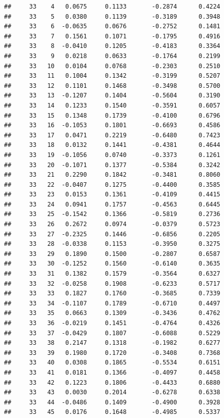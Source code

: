 \documentclass[
]{article}
\begin{document}
\begin{verbatim}
##     33    4   0.0675     0.1133       -0.2874      0.4224  
##     33    5   0.0380     0.1139       -0.3189      0.3948  
##     33    6  -0.0635     0.0676       -0.2752      0.1481  
##     33    7   0.1561     0.1071       -0.1795      0.4916  
##     33    8  -0.0410     0.1205       -0.4183      0.3364  
##     33    9   0.0218     0.0633       -0.1764      0.2199  
##     33   10   0.0104     0.0768       -0.2303      0.2510  
##     33   11   0.1004     0.1342       -0.3199      0.5207  
##     33   12   0.1101     0.1468       -0.3498      0.5700  
##     33   13  -0.1207     0.1404       -0.5604      0.3190  
##     33   14   0.1233     0.1540       -0.3591      0.6057  
##     33   15   0.1348     0.1739       -0.4100      0.6796  
##     33   16  -0.1053     0.1801       -0.6693      0.4586  
##     33   17   0.0471     0.2219       -0.6480      0.7423  
##     33   18   0.0132     0.1441       -0.4381      0.4644  
##     33   19  -0.1056     0.0740       -0.3373      0.1261  
##     33   20  -0.1071     0.1377       -0.5384      0.3242  
##     33   21   0.2290     0.1842       -0.3481      0.8060  
##     33   22  -0.0407     0.1275       -0.4400      0.3585  
##     33   23   0.0153     0.1361       -0.4109      0.4415  
##     33   24   0.0941     0.1757       -0.4563      0.6445  
##     33   25  -0.1542     0.1366       -0.5819      0.2736  
##     33   26   0.2672     0.0974       -0.0379      0.5723  
##     33   27  -0.2325     0.1446       -0.6856      0.2205  
##     33   28  -0.0338     0.1153       -0.3950      0.3275  
##     33   29   0.1890     0.1500       -0.2807      0.6587  
##     33   30  -0.1252     0.1560       -0.6140      0.3635  
##     33   31   0.1382     0.1579       -0.3564      0.6327  
##     33   32  -0.0258     0.1908       -0.6233      0.5717  
##     33   33   0.1827     0.1760       -0.3685      0.7339  
##     33   34  -0.1107     0.1789       -0.6710      0.4497  
##     33   35   0.0663     0.1309       -0.3436      0.4762  
##     33   36  -0.0219     0.1451       -0.4764      0.4326  
##     33   37  -0.0429     0.1807       -0.6088      0.5229  
##     33   38   0.2147     0.1318       -0.1982      0.6277  
##     33   39   0.1980     0.1720       -0.3408      0.7368  
##     33   40   0.0308     0.1865       -0.5534      0.6151  
##     33   41   0.0181     0.1366       -0.4097      0.4458  
##     33   42   0.1223     0.1806       -0.4433      0.6880  
##     33   43   0.0030     0.2014       -0.6278      0.6338  
##     33   44  -0.0486     0.1409       -0.4900      0.3928  
##     33   45   0.0176     0.1648       -0.4985      0.5337  

\end{verbatim}
\end{document}
